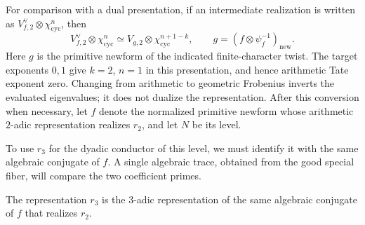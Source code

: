 For comparison with a dual presentation, if an intermediate realization is written as
$V_{f,2}^{\vee}\otimes\chi_{\mathrm{cyc}}^n$, then
\[
 V_{f,2}^{\vee}\otimes\chi_{\mathrm{cyc}}^n
 \simeq V_{g,2}\otimes\chi_{\mathrm{cyc}}^{n+1-k},
 \qquad g=(f\otimes\psi_f^{-1})_{\mathrm{new}}.
\]
Here $g$ is the primitive newform of the indicated finite-character
twist.  The target exponents $0,1$ give $k=2$, $n=1$ in this
presentation, and hence arithmetic Tate exponent zero.  Changing
from arithmetic to geometric Frobenius inverts the evaluated
eigenvalues; it does not dualize the representation.  After this
conversion when necessary, let $f$ denote the normalized primitive
newform whose arithmetic $2$-adic representation realizes $r_2$,
and let $N$ be its level.

To use $r_3$ for the dyadic conductor of this level, we must identify
it with the same algebraic conjugate of $f$.  A single algebraic
trace, obtained from the good special fiber, will compare the two
coefficient primes.

\begin{lemma}\label{hei:compatibility}
The representation $r_3$ is the $3$-adic representation of the same
algebraic conjugate of $f$ that realizes $r_2$.
\end{lemma}

